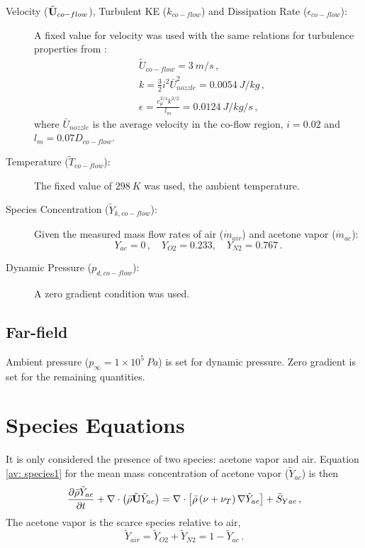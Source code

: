 \begin{description}
  \item[Velocity ($\tilde{\mathbf{U}}_{co-flow}$), Turbulent KE ($k_{co-flow}$) and Dissipation Rate ($\epsilon_{co-flow}$):] A fixed value for velocity was used with the same relations for turbulence properties from \cite{luppes}:
  \begin{equation}
  \begin{split}
  &\tilde{U}_{co-flow} =3\ m/s\, ,\\
   & k =\frac{3}{2} i^2 \bar{U}_{nozzle}^{2}= 0.0054\ J/kg \, , \\
   &\epsilon = \frac{c_{\mu}^{3/4} k^{3/2}}{l_m}=0.0124\ J/kg/s \, ,
  \end{split}
  \end{equation}
  where $\bar{U}_{nozzle}$ is the average velocity in the co-flow region, $i=0.02$ and $l_m = 0.07 D_{co-flow}$.
  
  \item[Temperature ($\tilde{T}_{co-flow}$):] The fixed value of $298\ K$ was used, the ambient temperature.
  \item[Species Concentration ($\tilde{Y}_{k,co-flow}$):] Given the measured mass flow rates of air ($\dot{m}_{air}$) and acetone vapor ($\dot{m}_{ac}$):
  \begin{equation}
  Y_{ac} = 0 \, , \quad Y_{O2} = 0.233 , \quad Y_{N2} = 0.767 \, .
  \end{equation}
  \item[Dynamic Pressure ($p_{d,co-flow}$):] A zero gradient condition was used.
\end{description}

\subsection{Far-field}

Ambient pressure ($p_{\infty}=1\times 10^5\ Pa$) is set for dynamic pressure. Zero gradient is set for the remaining quantities.

\section{Species Equations}

It is only considered the presence of two species: acetone vapor and air. Equation \eqref{av: species1} for the mean mass concentration of acetone vapor ($\tilde{Y}_{ac}$) is then
\begin{equation}
 \frac{\partial \bar{\rho} \tilde{Y}_{ac} }{\partial t} + \nabla
\cdot\left(\bar{\rho} \tilde{\mathbf{U}} \tilde{Y}_{ac} \right) = \nabla \cdot \left[ \bar{\rho} \left( \nu + \nu_T \right)
\nabla \tilde{Y}_{ac} \right] +\bar{S}_{Yac} \, ,
\end{equation}
The acetone vapor is the scarce species relative to air,
\begin{equation}
\tilde{Y}_{air} = \tilde{Y}_{O2} + \tilde{Y}_{N2}= 1- \tilde{Y}_{ac} \, .
\end{equation}
